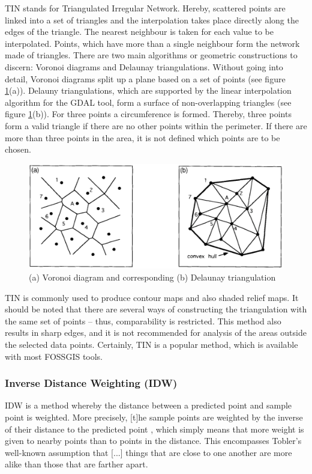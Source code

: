 TIN stands for \ldq{}Triangulated Irregular Network\rdq{}. Hereby, scattered points are linked into a set of triangles and the interpolation takes place directly along the edges of the triangle. The nearest neighbour is taken for each value to be interpolated. \cite{lam_spatial_2009} Points, which have more than a single neighbour form the network made of triangles. 
There are two main algorithms or geometric constructions to discern: Voronoi diagrams and Delaunay triangulations. \cite{sambridge_geophysical_1995} Without going into detail, Voronoi diagrams split up a plane based on a set of points (see figure \ref{fig:voronoi_delauny}(a)). Delauny triangulations, which are supported by the linear interpolation algorithm for the GDAL tool, form a surface of non-overlapping triangles (see figure \ref{fig:voronoi_delauny}(b)). For three points a circumference is formed. Thereby, three points form a valid triangle if there are no other points within the perimeter. If there are more than three points in the area, it is not defined which points are to be chosen.

\begin{figure}
	\includegraphics[width=\linewidth]{images/voronoi_delauny.png}
	\caption{(a) Voronoi diagram and corresponding (b) Delaunay triangulation\cite{sambridge_geophysical_1995}}
	\label{fig:voronoi_delauny}
\end{figure}

TIN is commonly used to produce contour maps and also shaded relief maps. \cite{lam_spatial_2009}
It should be noted that there are several ways of constructing the triangulation with the same set of points – thus, comparability is restricted. This method also results in sharp edges, and it is not recommended for analysis of the areas outside the selected data points. \cite{qgis_11_2021} Certainly, TIN is a popular method, which is available with most FOSSGIS tools. 

\subsubsection{Inverse Distance Weighting (IDW)}
IDW is a method whereby the distance between a predicted point and sample point is weighted. More precisely, \ldq{}[t]he sample points are weighted by the inverse of their distance to the predicted point\rdq{} \cite[p.2]{wenjing_cao_study_2009}, which simply means that more weight is given to nearby points than to points in the distance. \cite{lam_spatial_2009} This encompasses Tobler’s well-known assumption that \ldq{}[...] things that are close to one another are more alike than those that are farther apart\rdq{}. \cite{samanta_interpolation_2012}

